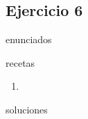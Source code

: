 \subsection{Ejercicio 6}
\def\parte{enunciados}
\ifx\capitulo\parte

\fi

\def\parte{recetas}
\ifx\capitulo\parte
\begin{enumerate}
\item
\end{enumerate}
\fi

\def\parte{soluciones}
\ifx\capitulo\parte
%
\fi
